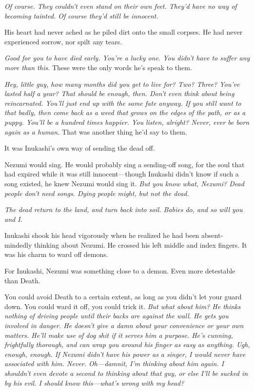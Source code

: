\emph{Of course. They couldn't even stand on their own feet. They'd have no
way of becoming tainted. Of course they'd still be innocent.}

His heart had never ached as he piled dirt onto the small corpses. He
had never experienced sorrow, nor spilt any tears.

\emph{Good for you to have died early. You're a lucky one. You didn't have to
suffer any more than this.} These were the only words he's speak to them.

\emph{Hey, little guy, how many months did you get to live for? Two? Three?
You've lasted half a year? That should be enough, then. Don't even think
about being reincarnated. You'll just end up with the same fate anyway.
If you still want to that badly, then come back as a weed that grows on
the edges of the path, or as a puppy. You'll be a hundred times happier.
You listen, alright? Never, ever be born again as a human.} That was
another thing he'd say to them.

It was Inukashi's own way of sending the dead off.

Nezumi would sing. He would probably sing a sending-off song, for the
soul that had expired while it was still innocent---though Inukashi didn't
know if such a song existed, he knew Nezumi would sing it. \emph{But you know
what, Nezumi? Dead people don't need songs. Dying people might, but not
the dead.}

\emph{The dead return to the land, and turn back into soil. Babies do, and so
will you and I.}

Inukashi shook his head vigorously when he realized he had been
absent-mindedly thinking about Nezumi. He crossed his left middle and
index fingers. It was his charm to ward off demons.

For Inukashi, Nezumi was something close to a demon. Even more
detestable than Death.

You could avoid Death to a certain extent, as long as you didn't let
your guard down. You could ward it off, you could trick it. \emph{But what
about him? He thinks nothing of driving people until their backs are
against the wall. He gets you involved in danger. He doesn't give a damn
about your convenience or your own matters. He'll make use of dog shit
if it serves him a purpose. He's cunning, frightfully thorough, and can
wrap you around his finger as easy as anything. Ugh, enough, enough. If
Nezumi didn't have his power as a singer, I would never have associated
with him. Never. Oh---damnit, I'm thinking about him again. I shouldn't
even devote a second to thinking about that guy, or else I'll be sucked
in by his evil. I should know this---what's wrong with my head?}

